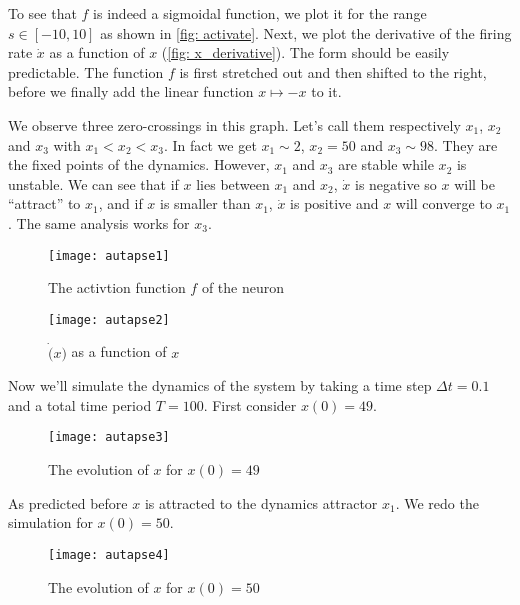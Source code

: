 To see that $f$ is indeed a sigmoidal function, we plot it for the range 
$s \in [-10, 10]$ as shown in \autoref{fig: activate}. Next, we plot the
derivative of the firing rate $\dot{x}$ as a function of $x$ 
(\autoref{fig: x_derivative}). The form should be easily predictable.
The function $f$ is first stretched out and then shifted to the right,
before we finally add the linear function $x \mapsto -x$ to it.

We observe three zero-crossings in this graph. Let's call them respectively
$x_1$, $x_2$ and $x_3$ with $x_1 < x_2 < x_3$. In fact we get $x_1 \sim 2$,
$x_2 = 50$ and $x_3 \sim 98$. They are the fixed points of the dynamics.
However, $x_1$ and $x_3$ are stable while $x_2$ is unstable.
We can see that if $x$ lies between $x_1$ and $x_2$, $\dot{x}$ is negative
so $x$ will be ``attract'' to $x_1$, and if $x$ is smaller than $x_1$,
$\dot{x}$ is positive and $x$ will converge to $x_1$. The same analysis
works for $x_3$.

\newpage

\vspace{-1em}
\begin{figure}[H]
  \centering
  \texttt{[image: autapse1]}
  \caption{The activtion function $f$ of the neuron}
  \label{fig: activate}
\end{figure}

\vspace{-1em}
\begin{figure}[H]
  \centering
  \texttt{[image: autapse2]}
  \caption{$\dot(x)$ as a function of $x$}
  \label{fig: x_derivative}
\end{figure}

Now we'll simulate the dynamics of the system by taking a time step 
$\Delta t = 0.1$ and a total time period $T = 100$. First consider
$x(0) = 49$.

\vspace{-1em}
\begin{figure}[H]
  \centering
  \texttt{[image: autapse3]}
  \caption{The evolution of $x$ for $x(0) = 49$}
\end{figure}

\noindent
As predicted before $x$ is attracted to the dynamics attractor $x_1$.
We redo the simulation for $x(0) = 50$.

\vspace{-1em}
\begin{figure}[H]
  \centering
  \texttt{[image: autapse4]}
  \caption{The evolution of $x$ for $x(0) = 50$}
\end{figure}

